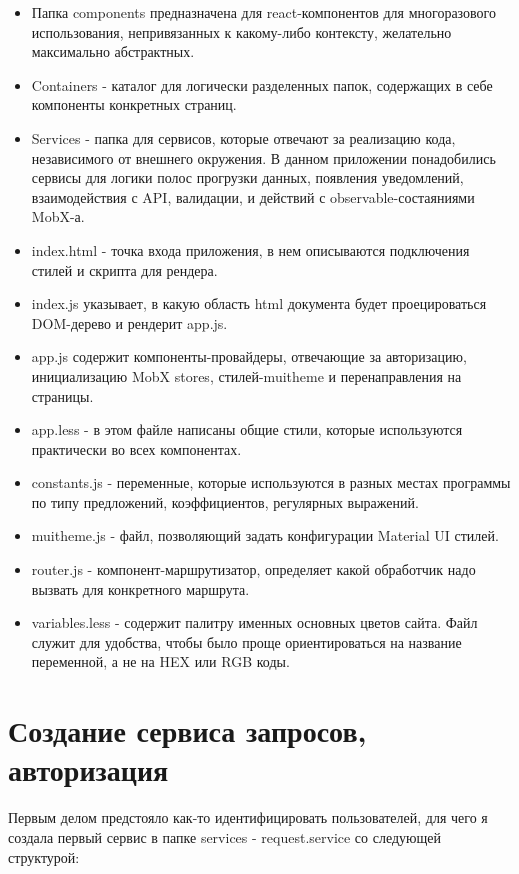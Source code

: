 \documentclass[a4paper,12pt]{diplom}
\begin{document}
\begin{itemize}
\item Папка components предназначена для react-компонентов для многоразового использования, непривязанных к какому-либо контексту, желательно максимально абстрактных.
\item Containers - каталог для логически разделенных папок, содержащих в себе компоненты конкретных страниц.
\item Services - папка для сервисов, которые отвечают за реализацию кода, независимого от внешнего окружения. В данном приложении понадобились сервисы для логики полос прогрузки данных, появления уведомлений, взаимодействия с API, валидации, и действий с observable-состаяниями MobX-а.
\item index.html - точка входа приложения, в нем описываются подключения стилей и скрипта для рендера.
\item index.js указывает, в какую область html документа будет проецироваться DOM-дерево и рендерит app.js.
\item app.js содержит компоненты-провайдеры, отвечающие за авторизацию, инициализацию MobX stores, стилей-muitheme и перенаправления на страницы.
\item app.less - в этом файле написаны общие стили, которые используются практически во всех компонентах.
\item constants.js - переменные, которые используются в разных местах программы по типу предложений, коэффициентов, регулярных выражений.
\item muitheme.js - файл, позволяющий задать конфигурации Material UI стилей.
\item router.js - компонент-маршрутизатор, определяет какой обработчик надо вызвать для конкретного маршрута.
\item variables.less - содержит палитру именных основных цветов сайта. Файл служит для удобства, чтобы было проще ориентироваться на название переменной, а не на HEX или RGB коды.
\end{itemize}

\section{Создание сервиса запросов, авторизация}

Первым делом предстояло как-то идентифицировать пользователей, для чего я создала первый сервис в папке services - request.service со следующей структурой:
\medskip
{}
\medskip
\end{document}
